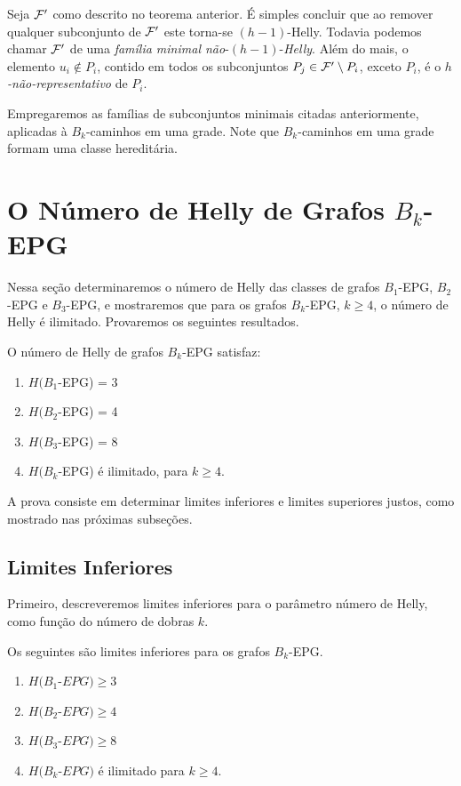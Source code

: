 Seja $\cal{ F'}$ como descrito no teorema anterior. É simples concluir que ao remover qualquer subconjunto de $\cal {F'}$ este torna-se $(h-1)$-Helly.  Todavia podemos chamar $\cal {F'}$ de uma {\it família minimal não}-$(h-1)$-{\it Helly}. Além do mais, o elemento $u_i \not \in P_i$, contido em todos os subconjuntos $P_j \in {\cal{F'}} \setminus P_i$, exceto $P_i$, é o {\it $h$-não-representativo} de $P_i$.  

Empregaremos as famílias de subconjuntos minimais citadas anteriormente, aplicadas à $B_k$-caminhos em uma grade. Note que $B_k$-caminhos em uma grade formam uma classe hereditária.

\section{O Número de Helly de Grafos $B_k$-EPG}\label{sec:Helly-number}

Nessa seção determinaremos o número de Helly das classes de grafos $B_1$-EPG, $B_2$-EPG e $B_3$-EPG, e mostraremos que para os grafos $B_k$-EPG, $k \geq 4$, o número de Helly é ilimitado. Provaremos os seguintes resultados.

\begin{theorem}\label{thm:Helly-EPG}
O número de Helly de grafos $B_k$-EPG satisfaz:
\begin{enumerate}[nosep,label=\emph{(\roman*)}]
\item  $H(B_1$-EPG) = 3 
\item $H(B_2$-EPG)  = 4 
\item $H(B_3$-EPG)  = 8 
\item $H(B_k$-EPG) é ilimitado, para 
$k \geq 4$.
\end{enumerate}

\end{theorem}

A prova consiste em determinar limites inferiores e limites superiores justos, como mostrado nas próximas subseções.

\subsection{Limites Inferiores}

Primeiro, descreveremos limites inferiores para o parâmetro número de Helly, como função do número de dobras $k$.

\begin{lema}\label{claim:lower-Bk-EPG} 
Os seguintes são limites inferiores para os grafos  $B_k$-EPG.
\begin{enumerate}[nosep,label=\emph{(\roman*)}]
\item   $H(B_1$-$EPG) \geq 3$ 
\item $H(B_2$-$EPG) \geq 4$ 
\item $H(B_3$-$EPG) \geq 8$ 
\item $H(B_k$-$EPG )$ é ilimitado para  $k \geq 4$.
\end{enumerate}
\end{lema}

